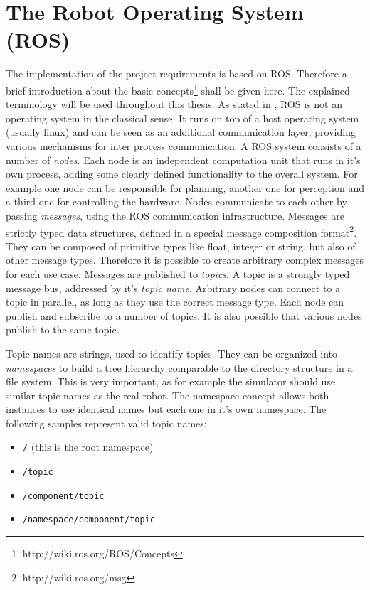 \section{The Robot Operating System (ROS)}

The implementation of the project requirements is based on ROS. Therefore a brief introduction about the basic concepts\footnote{http://wiki.ros.org/ROS/Concepts} shall be given here. The explained terminology will be used throughout this thesis. As stated in \cite{quigley2009}, ROS is not an operating system in the classical sense. It runs on top of a host operating system (usually linux) and can be seen as an additional communication layer, providing various mechanisms for inter process communication. A ROS system consists of a number of \emph{nodes}. Each node is an independent computation unit that runs in it's own process, adding some clearly defined functionality to the overall system. For example one node can be responsible for planning, another one for perception and a third one for controlling the hardware. Nodes communicate to each other by passing \emph{messages}, using the ROS communication infrastructure. Messages are strictly typed data structures, defined in a special message composition format\footnote{http://wiki.ros.org/msg}. They can be composed of primitive types like float, integer or string, but also of other message types. Therefore it is possible to create arbitrary complex messages for each use case. Messages are published to \emph{topics}. A topic is a strongly typed message bus, addressed by it's \emph{topic name}. Arbitrary nodes can connect to a topic in parallel, as long as they use the correct message type. Each node can publish and subscribe to a number of topics. It is also possible that various nodes publish to the same topic. 

Topic names are strings, used to identify topics. They can be organized into \emph{namespaces} to build a tree hierarchy comparable to the directory structure in a file system. This is very important, as for example the simulator should use similar topic names as the real robot. The namespace concept allows both instances to use identical names but each one in it's own namespace. The following samples represent valid topic names:
\begin{itemize}
\item \texttt{/} (this is the root namespace)
\item \texttt{/topic}
\item \texttt{/component/topic}
\item \texttt{/namespace/component/topic}
\end{itemize}

